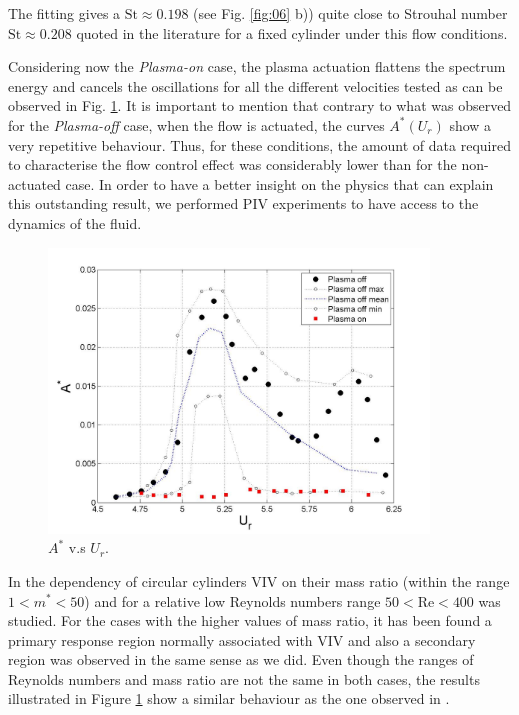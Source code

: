 \documentclass[review]{elsarticle}
\begin{document}
The fitting gives a $\text{St} \approx 0.198$ (see Fig. \ref{fig:06} b)) quite close to Strouhal number $\text{St} \approx 0.208$ quoted in the literature for a fixed cylinder under this flow conditions.

Considering now the {\it Plasma-on} case, the plasma actuation flattens the spectrum energy and  cancels the oscillations for all the different velocities tested as can be observed in Fig. \ref{fig:05}. It is important to mention that contrary to what was observed for the {\it Plasma-off} case, when the flow is actuated, the curves $A^*(U_r)$ show a very repetitive behaviour. Thus, for these conditions, the amount of data required to characterise the flow control effect was considerably lower than for the non-actuated case. In order to have a better insight on the physics that can explain this outstanding result, we performed PIV experiments to have access to the dynamics of the fluid.

\begin{figure}[h]
\centering
\includegraphics[width=0.9\textwidth]{Figures/Fig_05}
\caption{$A^*$ v.s $U_{r}$.}
\label{fig:05}
\end{figure}

In \cite{Willden2006} the dependency of circular cylinders VIV on their mass ratio (within  the range $1<m^*<50$) and for a relative low Reynolds numbers range $ 50 <\text{Re} < 400 $ was studied. For the cases with the higher values of mass ratio, it has been found a primary response region normally associated with VIV and also a secondary  region was observed in the same sense as we did. Even though the ranges of Reynolds numbers and mass ratio are not the same in both cases, the results illustrated in Figure \ref{fig:05} show a similar behaviour as the one observed in \cite{Willden2006}.
\end{document}
